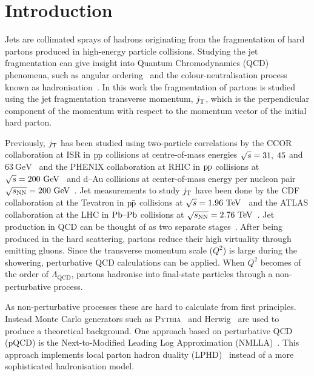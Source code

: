 \linenumbers

\section{Introduction}
\label{sec:introduction}
Jets are collimated sprays of hadrons originating from the fragmentation of hard partons produced in high-energy particle collisions. Studying the jet fragmentation can give insight into Quantum Chromodynamics (QCD)~\cite{gross1973ultraviolet, politzer1973reliable, gross1973asymptotically, gross1974asymptotically, georgi1974electroproduction} phenomena, such as angular ordering~\cite{basicsofpqcd} and the colour-neutralisation process known as hadronisation~\cite{introPythia81,herwigManual,herwig7releaseNote}. In this work the fragmentation of partons is studied using the jet fragmentation transverse momentum, $\jt{}$, which is the perpendicular component of the momentum with respect to the momentum vector of the initial hard parton.

Previously, $\jt{}$ has been studied using two-particle correlations by the CCOR collaboration at ISR in $\pp$ collisions at centre-of-mass energies $\sqrtS = 31,\;45$ and $63~\mathrm{GeV}$~\cite{firstjtmeasurement} and the PHENIX collaboration at RHIC in $\pp$ collisions at $\sqrtSE[GeV]{200}$~\cite{PHENIXjets} and d--Au collisions at center-of-mass energy per nucleon pair $\sqrtSnnE[GeV]{200}$~\cite{phenixJtPAu}.
Jet measurements to study $\jt{}$ have been done by the CDF collaboration at the Tevatron in $\ppbar$ collisions at $\sqrtSE{1.96}$~\cite{cdfpaper} and the ATLAS collaboration at the LHC in $\PbPb$ collisions at $\sqrtSnnE{2.76}$~\cite{atlaksenJetit}.
Jet production in QCD can be thought of as two separate stages~\cite{eventGenerators}. After being produced in the hard scattering, partons reduce their high virtuality through emitting gluons. Since the transverse momentum scale ($Q^{2}$) is large during the showering, perturbative QCD calculations can be applied. When $Q^{2}$ becomes of the order of $\Lambda_{\mathrm{QCD}}$, partons hadronise into final-state particles through a non-perturbative process.

As non-perturbative processes these are hard to calculate from first principles. Instead Monte Carlo generators such as \textsc{Pythia}~\cite{introPythia81} and Herwig~\cite{herwig7releaseNote} are used to produce a theoretical background. One approach based on perturbative QCD (pQCD) is the Next-to-Modified Leading Log Approximation (NMLLA)~\cite{nmlla}. This approach implements local parton hadron duality (LPHD)~\cite{Azimov:1984np} instead of a more sophisticated hadronisation model.

